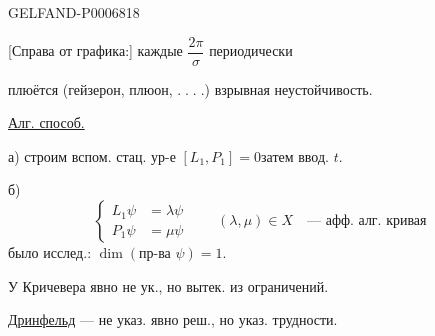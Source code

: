 \begin{GelfandAdjacentEvidence}{GELFAND-P000681}{8}


[Справа от графика:] каждые \(\dfrac{2\pi}{\sigma}\) периодически
\end{GelfandAdjacentEvidence}

плюётся
(гейзерон, плюон, \(.\;.\;.\;.\))
взрывная неустойчивость.

\underline{Алг. способ.}

а) строим вспом. стац. ур-е
\([L_1,P_1]=0\)\qquad затем ввод. \(t\).

б)
\[
\left\{\begin{aligned}
L_1\psi&=\lambda\psi\\
P_1\psi&=\mu\psi
\end{aligned}\right.
\qquad
(\lambda,\mu)\in X\quad\text{--- афф. алг. кривая}
\]
было исслед.: \underline{\(\dim(\text{пр-ва }\psi)=1\)}.

У Кричевера явно не ук., но вытек. из ограничений.

\underline{Дринфельд} --- не указ. явно реш., но указ. трудности.


